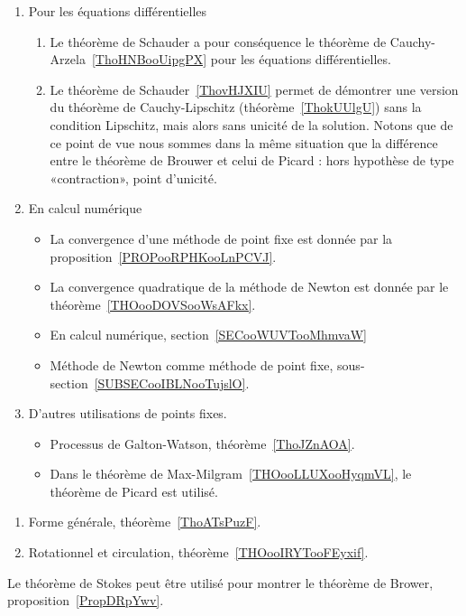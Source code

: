 \begin{enumerate}
\item Pour les équations différentielles
    \begin{enumerate}
        \item
            Le théorème de Schauder a pour conséquence le théorème de Cauchy-Arzela~\ref{ThoHNBooUipgPX} pour les équations différentielles.
        \item
            Le théorème de Schauder~\ref{ThovHJXIU} permet de démontrer une version du théorème de Cauchy-Lipschitz (théorème~\ref{ThokUUlgU}) sans la condition Lipschitz, mais alors sans unicité de la solution. Notons que de ce point de vue nous sommes dans la même situation que la différence entre le théorème de Brouwer et celui de Picard : hors hypothèse de type «contraction», point d'unicité.
    \end{enumerate}
\item
    En calcul numérique
    \begin{itemize}
        \item
            La convergence d'une méthode de point fixe est donnée par la proposition~\ref{PROPooRPHKooLnPCVJ}.
        \item
            La convergence quadratique de la méthode de Newton est donnée par le théorème~\ref{THOooDOVSooWsAFkx}.
        \item
            En calcul numérique, section~\ref{SECooWUVTooMhmvaW}
        \item
            Méthode de Newton comme méthode de point fixe, sous-section~\ref{SUBSECooIBLNooTujslO}.
    \end{itemize}

\item
    D'autres utilisations de points fixes.
\begin{itemize}
    \item
        Processus de Galton-Watson, théorème~\ref{ThoJZnAOA}.
    \item
        Dans le théorème de Max-Milgram~\ref{THOooLLUXooHyqmVL}, le théorème de Picard est utilisé.
\end{itemize}
\end{enumerate}


    \begin{enumerate}
        \item
            Forme générale, théorème~\ref{ThoATsPuzF}.
        \item
            Rotationnel et circulation, théorème~\ref{THOooIRYTooFEyxif}.
        \end{enumerate}
        Le théorème de Stokes peut être utilisé pour montrer le théorème de Brower, proposition~\ref{PropDRpYwv}.



